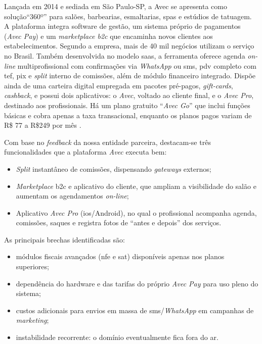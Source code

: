 Lançada em 2014 e sediada em São Paulo-SP, a Avec se apresenta como solução``360º'' para salões, barbearias, esmaltarias, spas e estúdios de tatuagem. A plataforma integra software de gestão, um sistema próprio de pagamentos (\emph{Avec Pay}) e um \emph{marketplace \gls{b2c}} que encaminha novos clientes aos estabelecimentos. Segundo a empresa, mais de 40 mil negócios utilizam o serviço no
Brasil. Também desenvolvida no modelo \gls{saas}, a ferramenta oferece agenda \emph{on-line} multiprofissional com confirmações via \emph{WhatsApp} ou \gls{sms}, \gls{pdv} completo com \gls{tef}, \gls{pix} e \emph{split} interno de comissões, além de módulo financeiro integrado. Dispõe ainda de uma carteira digital empregada em pacotes pré-pagos, \emph{gift-cards}, \emph{cashback}, e possui dois aplicativos: o \emph{Avec}, voltado ao cliente final, e o \emph{Avec Pro}, destinado aos profissionais. Há um plano gratuito ``\emph{Avec Go}'' que inclui funções básicas e cobra apenas a taxa transacional, enquanto os planos pagos variam de R\$ 77 a
R\$249 por mês \cite{Avec}.


Com base no \emph{feedback} da nossa entidade parceira, destacam-se três funcionalidades que
a plataforma \emph{Avec} executa bem:
\begin{itemize}
	\item \emph{Split} instantâneo de comissões, dispensando \emph{gateways} externos;
	\item \emph{Marketplace} \gls{b2c} e aplicativo do cliente, que ampliam a visibilidade do salão e aumentam os agendamentos \emph{on-line};
	\item Aplicativo \emph{Avec Pro} (\gls{ios}/Android), no qual o profissional acompanha agenda,
	comissões, saques e registra fotos de “antes e depois” dos serviços.
\end{itemize}

As principais brechas identificadas são:
\begin{itemize}
	\item módulos fiscais avançados (\gls{nfe} e \gls{sat}) disponíveis apenas nos planos superiores;
	\item dependência do hardware e das tarifas do próprio \emph{Avec Pay} para uso pleno do sistema;
	\item custos adicionais para envios em massa de \gls{sms}/\emph{WhatsApp} em campanhas de \emph{marketing};
	\item instabilidade recorrente: o domínio eventualmente fica fora do ar.
\end{itemize}

